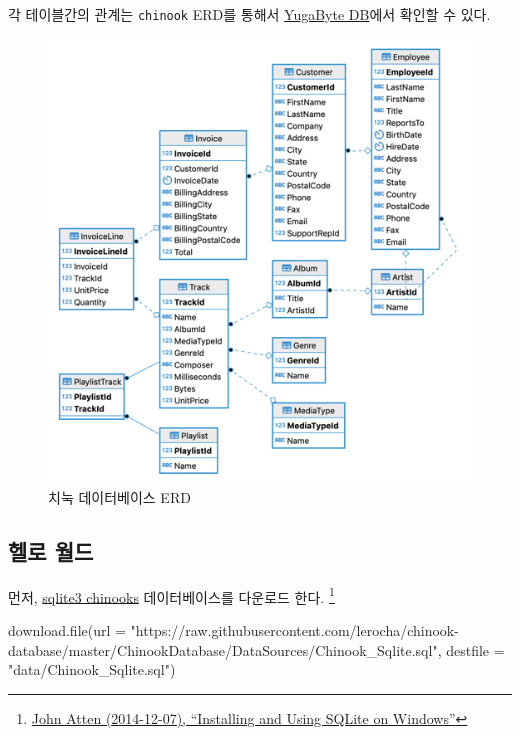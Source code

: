 \documentclass[
  letterpaper,
  chapter,a4paper,showtrims,openright,hidelinks]{oblivoir}
\newenvironment{Shaded}{\begin{snugshade}}{\end{snugshade}}
\newcommand{\AttributeTok}[1]{\textcolor[rgb]{0.40,0.45,0.13}{#1}}
\newcommand{\FunctionTok}[1]{\textcolor[rgb]{0.28,0.35,0.67}{#1}}
\newcommand{\NormalTok}[1]{\textcolor[rgb]{0.00,0.23,0.31}{#1}}
\newcommand{\StringTok}[1]{\textcolor[rgb]{0.13,0.47,0.30}{#1}}
\begin{document}
각 테이블간의 관계는 \texttt{chinook} ERD를 통해서
\href{https://docs.yugabyte.com/latest/sample-data/chinook/}{YugaByte
DB}에서 확인할 수 있다.

\begin{figure}

{\centering \includegraphics{images/database_chinook.png}

}

\caption{치눅 데이터베이스 ERD}

\end{figure}

\hypertarget{chinook-helloworld}{%
\subsection{헬로 월드}\label{chinook-helloworld}}

먼저, \href{https://github.com/lerocha/chinook-database}{sqlite3
chinooks} 데이터베이스를 다운로드 한다. \footnote{\href{http://johnatten.com/2014/12/07/installing-and-using-sqlite-on-windows/}{John
  Atten (2014-12-07), ``Installing and Using SQLite on Windows''}}

\begin{Shaded}
\begin{Highlighting}[]
\FunctionTok{download.file}\NormalTok{(}\AttributeTok{url =} \StringTok{"https://raw.githubusercontent.com/lerocha/chinook{-}database/master/ChinookDatabase/DataSources/Chinook\_Sqlite.sql"}\NormalTok{, }\AttributeTok{destfile =} \StringTok{"data/Chinook\_Sqlite.sql"}\NormalTok{)}
\end{Highlighting}
\end{Shaded}
\end{document}
